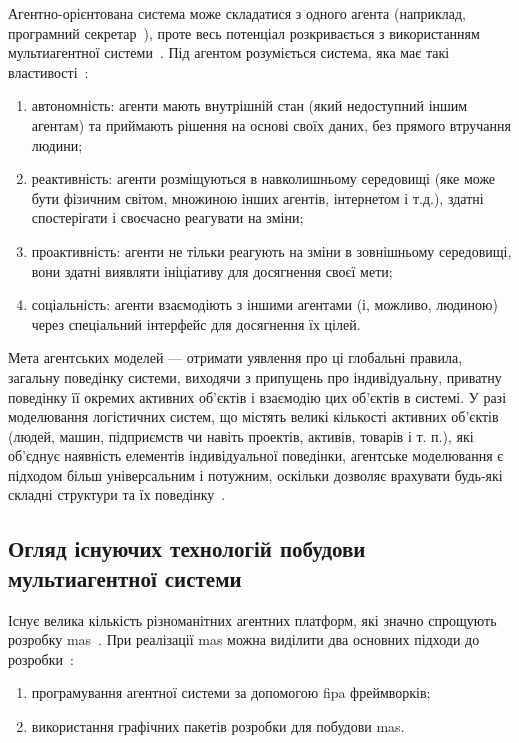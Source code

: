 Агентно-орієнтована система може складатися з одного агента (наприклад, програмний секретар~\cite{Maes1995}), проте весь потенціал розкривається з використанням мультиагентної системи~\cite{Waters1989}.
Під агентом розуміється система, яка має такі властивості~\cite{Jennings1998,Wooldridge1995}:
\begin{enumerate}[label={\arabic*)}]
	\item автономність: агенти мають внутрішній стан (який недоступний іншим агентам) та приймають рішення на основі своїх даних, без прямого втручання людини;
	\item реактивність: агенти розміщуються в навколишньому середовищі (яке може бути фізичним світом, множиною інших агентів, інтернетом і т.д.), здатні спостерігати і своєчасно реагувати на зміни;
	\item проактивність: агенти не тільки реагують на зміни в зовнішньому середовищі, вони здатні виявляти ініціативу для досягнення своєї мети;
	\item соціальність: агенти взаємодіють з іншими агентами (і, можливо, людиною) через спеціальний інтерфейс для досягнення їх цілей.
\end{enumerate}

Мета агентських моделей --- отримати уявлення про ці глобальні правила, загальну поведінку системи, виходячи з припущень про індивідуальну, приватну поведінку її окремих активних об'єктів і взаємодію цих об'єктів в системі.
У разі моделювання логістичних систем, що містять великі кількості активних об'єктів (людей, машин, підприємств чи навіть проектів, активів, товарів і т. п.), які об'єднує наявність елементів індивідуальної поведінки, агентське моделювання є підходом більш універсальним і потужним, оскільки дозволяє врахувати будь-які складні структури та їх поведінку~\cite{Shamrin2016}. 

\subsection{Огляд існуючих технологій побудови мультиагентної системи}
Існує велика кількість різноманітних агентних платформ, які значно спрощують розробку \acrshort{mas}~\cite{Kravari2015}.
При реалізації \acrshort{mas} можна виділити два основних підходи до розробки~\cite{Zhou2010}:
\begin{enumerate}[label={\arabic*)}]
	\item програмування агентної системи за допомогою \acrshort{fipa} фреймворків;
	\item використання графічних пакетів розробки для побудови \acrshort{mas}.
\end{enumerate}

